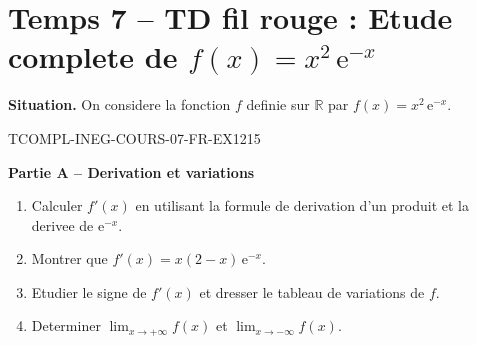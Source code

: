 

\section*{Temps 7 -- TD fil rouge : Etude complete de $f(x) = x^2\,\mathrm{e}^{-x}$}

\textbf{Situation.} On considere la fonction $f$ definie sur $\mathbb{R}$ par $f(x) = x^2\,\mathrm{e}^{-x}$.

\bigskip


\begin{exercice}{TCOMPL-INEG-COURS-07-FR-EX1}{2}{15}

\textbf{Partie A -- Derivation et variations}

\begin{enumerate}
  \item Calculer $f'(x)$ en utilisant la formule de derivation d'un produit et la derivee de $\mathrm{e}^{-x}$.
  \item Montrer que $f'(x) = x(2-x)\,\mathrm{e}^{-x}$.
  \item Etudier le signe de $f'(x)$ et dresser le tableau de variations de $f$.
  \item Determiner $\lim_{x \to +\infty} f(x)$ et $\lim_{x \to -\infty} f(x)$.
\end{enumerate}

\end{exercice}

